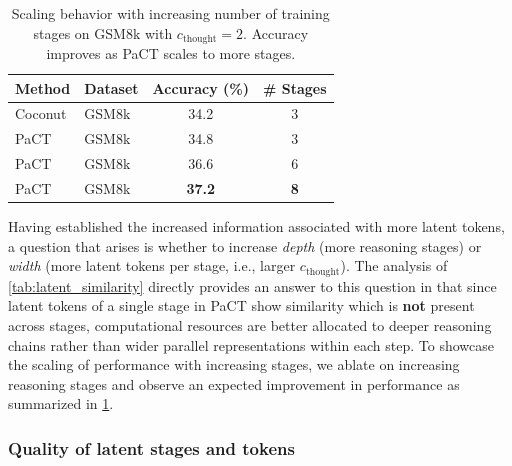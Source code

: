 \begin{table}[H]
\centering
\small
\begin{tabular}{l l c c}
\toprule
Method & Dataset & Accuracy (\%) & \# Stages \\
\midrule
Coconut & GSM8k & 34.2 & 3 \\
PaCT & GSM8k & 34.8 & 3 \\
PaCT & GSM8k & 36.6 & 6 \\
PaCT & GSM8k & \textbf{37.2} & \textbf{8} \\
\bottomrule
\end{tabular}

\caption{Scaling behavior with increasing number of training stages on GSM8k with $c_{\text{thought}}=2$. Accuracy improves as PaCT scales to more stages.}
\label{tab:stage_scaling}
\end{table}



Having established the increased information associated with more latent tokens, a question that arises is whether to increase \emph{depth} (more reasoning stages) or \emph{width} (more latent tokens per stage, i.e., larger $c_{\text{thought}}$). The analysis of \ref{tab:latent_similarity} directly provides an answer to this question in that since latent tokens of a single stage in PaCT show similarity which is \textbf{not} present across stages, computational resources are better allocated to deeper reasoning chains rather than wider parallel representations within each step. To showcase the scaling of performance with increasing stages, we ablate on increasing reasoning stages and observe an expected improvement in performance as summarized in \ref{tab:stage_scaling}.


\subsubsection{Quality of latent stages and tokens}

